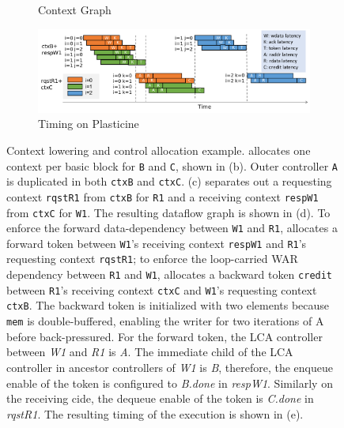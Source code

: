 \begin{figure}
\begin{subfigure}[b]{0.23\textwidth}
\caption{Context Graph}
\end{subfigure}
\begin{subfigure}[b]{0.76\textwidth}
\includegraphics[width=1\textwidth]{figs/plasticinetiming.pdf}
\caption{Timing on Plasticine}
\end{subfigure}
\caption[Context allocation and control allocation]{
  Context lowering and control allocation example.
  \name allocates one context per basic block for \texttt{B} and \texttt{C}, shown in (b). Outer controller \texttt{A} is
  duplicated in both \texttt{ctxB} and \texttt{ctxC}.
  (c) \name separates out a requesting context \texttt{rqstR1} from \texttt{ctxB} for \texttt{R1} 
  and a receiving context \texttt{respW1} from \texttt{ctxC} for \texttt{W1}.
  The resulting dataflow graph is shown in (d). 
  To enforce the forward data-dependency between \texttt{W1} and \texttt{R1}, 
  \name allocates a forward token between \texttt{W1}'s receiving context \texttt{respW1} and
  \texttt{R1}'s requesting context \texttt{rqstR1};
  to enforce the loop-carried WAR dependency between \texttt{R1} and \texttt{W1}, \name allocates a
  backward token \texttt{credit} between \texttt{R1}'s receiving context \texttt{ctxC} and 
  \texttt{W1}'s requesting context \texttt{ctxB}. 
  The backward token is initialized with two elements because \texttt{mem} is double-buffered,
  enabling the writer for two iterations of A before back-pressured.
  For the forward token, the LCA controller between \emph{W1} and \emph{R1} is \emph{A}. The
  immediate child of the LCA controller in ancestor controllers of \emph{W1} is \emph{B}, therefore,
  the enqueue enable of the token is configured to \emph{B.done} in \emph{respW1}. Similarly on the
  receiving cide, the dequeue enable of the token is \emph{C.done} in \emph{rqstR1}.
  The resulting timing of the execution is shown in (e).
}
\label{fig:contextalloc}
\end{figure}

